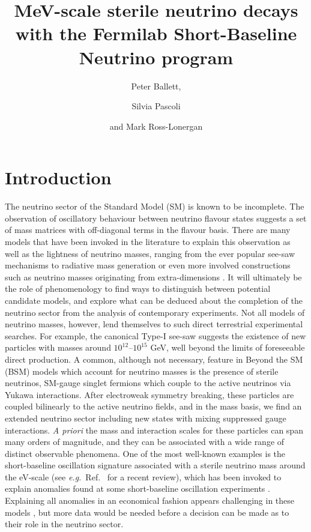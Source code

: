 \documentclass[11pt, a4paper]{article}
\title{MeV-scale sterile neutrino decays with the Fermilab Short-Baseline Neutrino program}
\author{Peter Ballett,}
\author{Silvia Pascoli}
\author{and Mark Ross-Lonergan}
\affiliation{Institute for Particle Physics Phenomenology, Department of
Physics, Durham University, South Road, Durham DH1 3LE, United Kingdom}
\newcommand{\refref}[1]{Ref.~\cite{#1}}
\def\eg{\emph{e.g.}}
\begin{document}
 

\maketitle

\section{Introduction}

The neutrino sector of the Standard Model (SM) is known to be incomplete. The
observation of oscillatory behaviour between neutrino flavour states
\cite{Fukuda:1998mi} suggests a set of mass matrices with off-diagonal terms in
the flavour basis. There are many models that have been invoked in the
literature to explain this observation as well as the lightness of neutrino
masses, ranging from the ever popular see-saw mechanisms
\cite{Minkowski:1977sc, GellMann:1980vs, Mohapatra:1979ia} to radiative mass
generation \cite{Zee:1980ai,Babu:1988ki} or even more involved constructions
such as neutrino masses originating from extra-dimensions
\cite{ArkaniHamed:1998vp}.  It will ultimately be the role of phenomenology to
find ways to distinguish between potential candidate models, and explore what
can be deduced about the completion of the neutrino sector from the analysis of
contemporary experiments.
%
Not all models of neutrino masses, however, lend themselves to such direct
terrestrial experimental searches. For example, the canonical Type-I see-saw
\cite{Minkowski:1977sc, GellMann:1980vs, Mohapatra:1979ia} suggests the
existence of new particles with masses  around $10^{12}$--$10^{15}$ GeV, well
beyond the limits of foreseeable direct production. A common, although not
necessary, feature in Beyond the SM (BSM) models which account for neutrino
masses is the presence of sterile neutrinos, SM-gauge singlet fermions which
couple to the active neutrinos via Yukawa interactions. After electroweak
symmetry breaking, these particles are coupled bilinearly to the active
neutrino fields, and in the mass basis, we find an extended neutrino sector
including new states with mixing suppressed gauge interactions. \emph{A priori}
the mass and interaction scales for these particles can span many orders of
magnitude, and they can be associated with a wide range of distinct observable
phenomena. 
%
One of the most well-known examples is the short-baseline oscillation signature
associated with a sterile neutrino mass around the eV-scale (see \eg\
\refref{Gariazzo:2015rra} for a recent review), which has been invoked to explain
anomalies found at some short-baseline oscillation experiments
\cite{Aguilar:2001ty, Aguilar-Arevalo:2013pmq, AguilarArevalo:2008rc}.
Explaining all anomalies in an economical fashion appears challenging in these
models \cite{Kopp:2013vaa,Conrad:2012qt}, but more data would be needed before
a decision can be made as to their role in the neutrino sector. 
\end{document}
